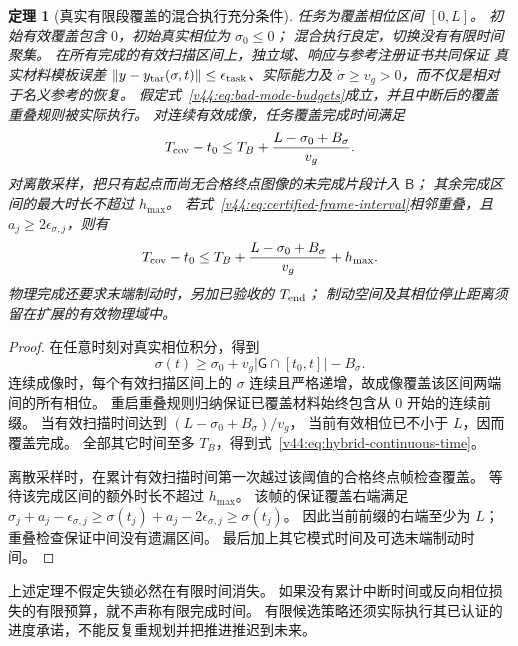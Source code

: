 \documentclass[11pt,a4paper]{article}
\numberwithin{equation}{section}
\newtheorem{theorem}{定理}[section]
\theoremstyle{definition}
\begin{document}
\begin{theorem}[真实有限段覆盖的混合执行充分条件]
\label{v44:thm:hybrid-finish}
任务为覆盖相位区间 $[0,L]$。
初始有效覆盖包含 $0$，初始真实相位为 $\sigma_0\le0$；
混合执行良定，切换没有有限时间聚集。
在所有完成的有效扫描区间上，独立域、响应与参考注册证书共同保证
真实材料模板误差 $\|y-y_{\rm tar}(\sigma,t)\|\le\epsilon_{\rm task}$、实际能力及
$\dot\sigma\ge v_g>0$，而不仅是相对于名义参考的恢复。
假定式~\eqref{v44:eq:bad-mode-budgets}成立，并且中断后的覆盖重叠规则被实际执行。
对连续有效成像，任务覆盖完成时间满足
\begin{equation}
 T_{\rm cov}-t_0\le T_B+\frac{L-\sigma_0+B_\sigma}{v_g}.
 \label{v44:eq:hybrid-continuous-time}
\end{equation}
对离散采样，把只有起点而尚无合格终点图像的未完成片段计入 $\mathsf B$；
其余完成区间的最大时长不超过 $h_{\max}$。
若式~\eqref{v44:eq:certified-frame-interval}相邻重叠，且
$a_j\ge2\epsilon_{\sigma,j}$，则有
\begin{equation}
 T_{\rm cov}-t_0\le T_B+\frac{L-\sigma_0+B_\sigma}{v_g}+h_{\max}.
 \label{v44:eq:hybrid-sampled-time}
\end{equation}
物理完成还要求末端制动时，另加已验收的 $T_{\rm end}$；
制动空间及其相位停止距离须留在扩展的有效物理域中。
\end{theorem}
\begin{proof}
在任意时刻对真实相位积分，得到
\begin{equation}
 \sigma(t)\ge\sigma_0+v_g|\mathsf G\cap[t_0,t]|-B_\sigma.
 \label{v44:eq:actual-phase-accounting}
\end{equation}
连续成像时，每个有效扫描区间上的 $\sigma$ 连续且严格递增，故成像覆盖该区间两端间的所有相位。
重启重叠规则归纳保证已覆盖材料始终包含从 $0$ 开始的连续前缀。
当有效扫描时间达到 $(L-\sigma_0+B_\sigma)/v_g$，
当前有效相位已不小于 $L$，因而覆盖完成。
全部其它时间至多 $T_B$，得到式~\eqref{v44:eq:hybrid-continuous-time}。

离散采样时，在累计有效扫描时间第一次越过该阈值的合格终点帧检查覆盖。
等待该完成区间的额外时长不超过 $h_{\max}$。
该帧的保证覆盖右端满足
$\widehat\sigma_j+a_j-\epsilon_{\sigma,j}
\ge\sigma(t_j)+a_j-2\epsilon_{\sigma,j}\ge\sigma(t_j)$。
因此当前前缀的右端至少为 $L$；重叠检查保证中间没有遗漏区间。
最后加上其它模式时间及可选末端制动时间。
\end{proof}

上述定理不假定失锁必然在有限时间消失。
如果没有累计中断时间或反向相位损失的有限预算，就不声称有限完成时间。
有限候选策略还须实际执行其已认证的进度承诺，不能反复重规划并把推进推迟到未来。
\end{document}
